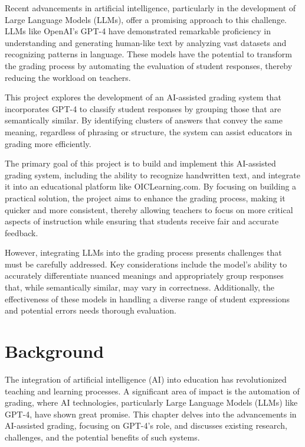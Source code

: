 \documentclass[ms,twoside,print]{nuthesis}
\begin{document}
Recent advancements in artificial intelligence, particularly in the development of Large Language Models (LLMs), offer a promising approach to this challenge. LLMs like OpenAI's GPT-4 have demonstrated remarkable proficiency in understanding and generating human-like text by analyzing vast datasets and recognizing patterns in language. These models have the potential to transform the grading process by automating the evaluation of student responses, thereby reducing the workload on teachers.

This project explores the development of an AI-assisted grading system that incorporates GPT-4 to classify student responses by grouping those that are semantically similar. By identifying clusters of answers that convey the same meaning, regardless of phrasing or structure, the system can assist educators in grading more efficiently.

The primary goal of this project is to build and implement this AI-assisted grading system, including the ability to recognize handwritten text, and integrate it into an educational platform like OICLearning.com. By focusing on building a practical solution, the project aims to enhance the grading process, making it quicker and more consistent, thereby allowing teachers to focus on more critical aspects of instruction while ensuring that students receive fair and accurate feedback.

However, integrating LLMs into the grading process presents challenges that must be carefully addressed. Key considerations include the model's ability to accurately differentiate nuanced meanings and appropriately group responses that, while semantically similar, may vary in correctness. Additionally, the effectiveness of these models in handling a diverse range of student expressions and potential errors needs thorough evaluation.

\chapter{Background}

The integration of artificial intelligence (AI) into education has revolutionized teaching and learning processes. A significant area of impact is the automation of grading, where AI technologies, particularly Large Language Models (LLMs) like GPT-4, have shown great promise. This chapter delves into the advancements in AI-assisted grading, focusing on GPT-4's role, and discusses existing research, challenges, and the potential benefits of such systems.
\end{document}
